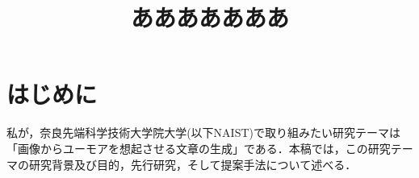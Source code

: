 \documentclass[twocolumn]{jarticle}%
\title{\vspace{5mm}\large{あああああああ}\vspace{-15mm}}
\date{}
\begin{document}
\small
\maketitle

\section{はじめに}
\thispagestyle{fancy}

私が，奈良先端科学技術大学院大学(以下NAIST)で取り組みたい研究テーマは「画像からユーモアを想起させる文章の生成」である．本稿では，この研究テーマの研究背景及び目的，先行研究，そして提案手法について述べる．



\end{document}

